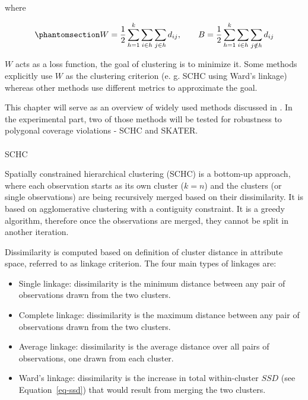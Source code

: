 \documentclass[
  english,
  12pt,
  a4paper,
]{article}
\makeatletter
\let\oldparagraph\paragraph
\renewcommand{\paragraph}{
    \@ifstar
      \xxxParagraphStar
      \xxxParagraphNoStar
  }
\newcommand{\xxxParagraphStar}[1]{\oldparagraph*{#1}\mbox{}}
\newcommand{\xxxParagraphNoStar}[1]{\oldparagraph{#1}\mbox{}}
\providecommand{\tightlist}{%
  \setlength{\itemsep}{0pt}\setlength{\parskip}{0pt}}
\makeatother
\begin{document}
where

\begin{equation}\phantomsection\label{eq-wb_explained}{W = \frac{1}{2} \sum_{h=1}^{k} \sum_{i \in h} \sum_{j \in h} d_{ij}, \qquad B = \frac{1}{2} \sum_{h=1}^{k} \sum_{i \in h} \sum_{j \notin h} d_{ij}}\end{equation}

\(W\) acts as a loss function, the goal of clustering is to minimize it.
Some methods explicitly use \(W\) as the clustering criterion (e. g.
SCHC using Ward's linkage) whereas other methods use different metrics
to approximate the goal.

This chapter will serve as an overview of widely used methods discussed
in \citet{anselin2024}. In the experimental part, two of those methods
will be tested for robustness to polygonal coverage violations - SCHC
and SKATER.

\paragraph{SCHC}\label{sec-schc}

Spatially constrained hierarchical clustering (SCHC) is a bottom-up
approach, where each observation starts as its own cluster (\(k=n\)) and
the clusters (or single observations) are being recursively merged based
on their dissimilarity. It is based on agglomerative clustering with a
contiguity constraint. It is a greedy algorithm, therefore once the
observations are merged, they cannot be split in another iteration.

Dissimilarity is computed based on definition of cluster distance in
attribute space, referred to as linkage criterion. The four main types
of linkages are:

\begin{itemize}
\tightlist
\item
  Single linkage: dissimilarity is the minimum distance between any pair
  of observations drawn from the two clusters.
\item
  Complete linkage: dissimilarity is the maximum distance between any
  pair of observations drawn from the two clusters.
\item
  Average linkage: dissimilarity is the average distance over all pairs
  of observations, one drawn from each cluster.
\item
  Ward's linkage: dissimilarity is the increase in total within-cluster
  \(SSD\) (see Equation~\ref{eq-ssd}) that would result from merging the
  two clusters.
\end{itemize}
\end{document}
